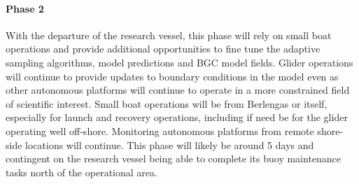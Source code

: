  

 

\paragraph{Phase 2} With the departure of the research vessel, this
phase will rely on small boat operations and provide additional
opportunities to fine tune the adaptive sampling algorithms, model
predictions and BGC model fields. Glider operations will continue to
provide updates to boundary conditions in the model even as other
autonomous platforms will continue to operate in a more constrained
field of scientific interest. Small boat operations will be from
Berlengas or \naz itself, especially for launch and recovery
operations, including if need be for the glider operating well
off-shore.  Monitoring autonomous platforms from remote shore-side
locations will continue. This phase will likely be around 5 days and
contingent on the research vessel being able to complete its buoy
maintenance tasks north of the \naz operational area.

